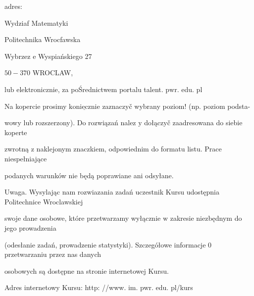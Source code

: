 \documentclass[a4paper,12pt]{article}
\begin{document}
adres:

Wydziaf Matematyki

Politechnika Wrocfawska

Wybrzez $\mathrm{e}$ Wyspiańskiego 27

$50-370$ WROCLAW,

$\mathrm{l}\mathrm{u}\mathrm{b}$ elektronicznie, za poŚrednictwem portalu talent. $\mathrm{p}\mathrm{w}\mathrm{r}$. edu. pl

Na kopercie prosimy $\underline{\mathrm{k}\mathrm{o}\mathrm{n}\mathrm{i}\mathrm{e}\mathrm{c}\mathrm{z}\mathrm{n}\mathrm{i}\mathrm{e}}$ zaznaczyč wybrany poziom! (np. poziom podsta-

wowy lub rozszerzony). Do rozwiązań nalez $\mathrm{y}$ dołączyč zaadresowana do siebie koperte

zwrotną $\mathrm{z}$ naklejonym znaczkiem, odpowiednim do formatu listu. Prace niespełniające

podanych warunków nie będą poprawiane ani odsyłane.

Uwaga. Wysylając nam rozwiazania zadań uczestnik Kursu udostępnia Politechnice Wroclawskiej

swoje dane osobowe, które przetwarzamy wyłącznie $\mathrm{w}$ zakresie niezbędnym do jego prowadzenia

(odesłanie zadań, prowadzenie statystyki). Szczegółowe informacje $0$ przetwarzaniu przez nas danych

osobowych są dostępne na stronie internetowej Kursu.

Adres internetowy Kursu: http: //www. im. pwr. edu. pl/kurs
\end{document}

